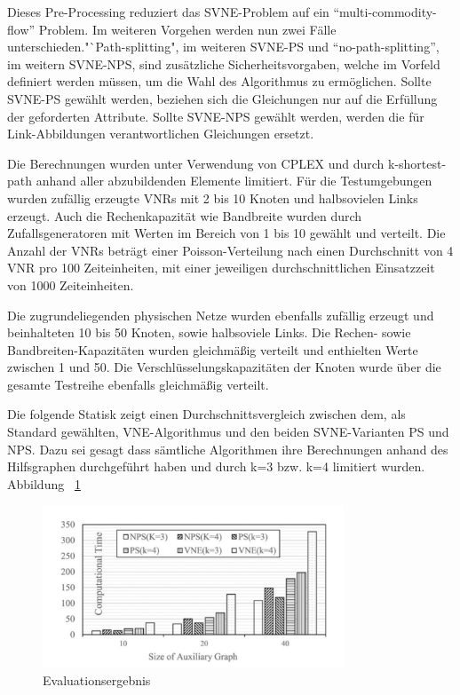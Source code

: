 \documentclass{lni}
\begin{document}
Dieses Pre-Processing reduziert das SVNE-Problem auf ein "`multi-commodity-flow"' Problem. \cite{MCF}
Im weiteren Vorgehen werden nun zwei Fälle unterschieden."`Path-splitting", im weiteren SVNE-PS und "`no-path-splitting"', im weitern SVNE-NPS, sind zusätzliche Sicherheitsvorgaben, welche im Vorfeld definiert werden müssen, um die Wahl des Algorithmus zu ermöglichen. Sollte SVNE-PS gewählt werden, beziehen sich die Gleichungen nur auf die Erfüllung der geforderten Attribute.
Sollte SVNE-NPS gewählt werden, werden die für Link-Abbildungen verantwortlichen Gleichungen ersetzt.\newline

Die Berechnungen wurden unter Verwendung von CPLEX und durch k-shortest-path anhand aller abzubildenden Elemente limitiert\cite{CPLEX}.
Für die Testumgebungen wurden zufällig erzeugte VNRs mit 2 bis 10 Knoten und halbsovielen Links erzeugt. Auch die Rechenkapazität wie Bandbreite wurden durch Zufallsgeneratoren mit Werten im Bereich von 1 bis 10 gewählt und verteilt. Die Anzahl der VNRs beträgt einer Poisson-Verteilung nach einen Durchschnitt von 4 VNR pro 100 Zeiteinheiten, mit einer jeweiligen durchschnittlichen Einsatzzeit von 1000 Zeiteinheiten.

Die zugrundeliegenden physischen Netze wurden ebenfalls zufällig erzeugt und beinhalteten 10 bis 50 Knoten, sowie halbsoviele Links. Die Rechen- sowie Bandbreiten-Kapazitäten wurden gleichmäßig verteilt und enthielten Werte zwischen 1 und 50. Die Verschlüsselungskapazitäten der Knoten  wurde über die gesamte Testreihe ebenfalls gleichmäßig verteilt.

Die folgende Statisk zeigt einen Durchschnittsvergleich zwischen dem, als Standard gewählten, VNE-Algorithmus und den beiden SVNE-Varianten PS und NPS\cite{Std}. Dazu sei gesagt dass sämtliche Algorithmen ihre Berechnungen anhand des Hilfsgraphen durchgeführt haben und durch k=3 bzw. k=4 limitiert wurden. Abbildung ~\ref{graph10} \newline

\begin{figure}[htb]
\begin{center}
	\includegraphics[width=0.8\textwidth]{statistic.pdf}\newline
	\caption{\label{graph10} Evaluationsergebnis \cite{wang2016towards}}
\end{center}
\end{figure}
\end{document}
